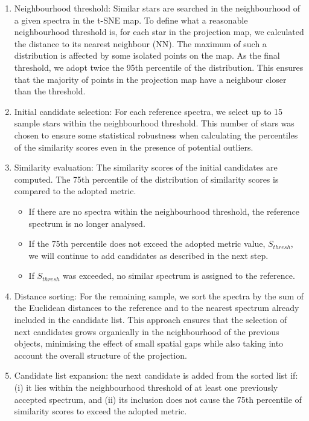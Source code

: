 \documentclass{aa}
\begin{document}
\begin{enumerate}
  
    \item Neighbourhood threshold: Similar stars are searched in the neighbourhood of a given spectra in the t-SNE map. To define what a reasonable neighbourhood threshold is, for each star in the projection map, we calculated the distance to its nearest neighbour (NN). The maximum of such a distribution is affected by some isolated points on the map. As the final threshold, we adopt twice the 95th percentile of the distribution. This ensures that the majority of points in the projection map have a neighbour closer than the threshold.

    \item Initial candidate selection: For each reference spectra, we select up to 15 sample stars within the neighbourhood threshold. This number of stars was chosen to ensure some statistical robustness when calculating the percentiles of the similarity scores even in the presence of potential outliers.

    \item Similarity evaluation: The similarity scores of the initial candidates are computed. The 75th percentile of the distribution of similarity scores is compared to the adopted metric.

    \begin{itemize}
         \item If there are no spectra within the neighbourhood threshold, the reference spectrum is no longer analysed.
        \item If the 75th percentile does not exceed the adopted metric value, $S_{thresh}$, we will continue to add candidates as described in the next step.
        \item If $S_{thresh}$ was exceeded, no similar spectrum is assigned to the reference.
    \end{itemize}

     \item Distance sorting: For the remaining sample, we sort the spectra by the sum of the Euclidean distances to the reference and to the nearest spectrum already included in the candidate list. This approach ensures that the selection of next candidates grows organically in the neighbourhood of the previous objects, minimising the effect of small spatial gaps while also taking into account the overall structure of the projection.

     \item Candidate list expansion: the next candidate is added from the sorted list if: (i) it lies within the neighbourhood threshold of at least one previously accepted spectrum, and (ii) its inclusion does not cause the 75th percentile of similarity scores to exceed the adopted metric. 


\end{enumerate}
\end{document}
